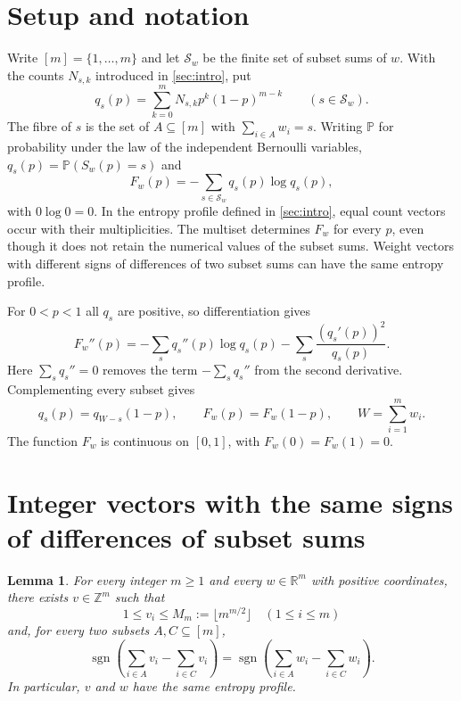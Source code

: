\documentclass[11pt,a4paper]{article}
\numberwithin{equation}{section}
\newtheorem{lemma}[theorem]{Lemma}
\theoremstyle{remark}
\newcommand{\Pp}{\mathbb P}
\newcommand{\R}{\mathbb R}
\newcommand{\Z}{\mathbb Z}
\newcommand{\sgn}{\operatorname{sgn}}
\begin{document}
\section{Setup and notation}\label{sec:setup}

Write $[m]=\{1,\ldots,m\}$ and let $\mathcal S_w$ be the finite set of subset sums of $w$. With the counts $N_{s,k}$ introduced in \cref{sec:intro}, put
\begin{equation}\label{eq:counts}
 q_s(p)=\sum_{k=0}^m N_{s,k}p^k(1-p)^{m-k}\qquad(s\in\mathcal S_w).
\end{equation}
The fibre of $s$ is the set of $A\subseteq[m]$ with $\sum_{i\in A}w_i=s$. Writing $\Pp$ for probability under the law of the independent Bernoulli variables, $q_s(p)=\Pp(S_w(p)=s)$ and
\begin{equation}\label{eq:entropy}
 F_w(p)=-\sum_{s\in\mathcal S_w}q_s(p)\log q_s(p),
\end{equation}
with $0\log0=0$. In the entropy profile defined in \cref{sec:intro}, equal count vectors occur with their multiplicities. The multiset determines $F_w$ for every $p$, even though it does not retain the numerical values of the subset sums. Weight vectors with different signs of differences of two subset sums can have the same entropy profile.

For $0<p<1$ all $q_s$ are positive, so differentiation gives
\begin{equation}\label{eq:curvature}
 F_w''(p)=-\sum_s q_s''(p)\log q_s(p)
            -\sum_s\frac{(q_s'(p))^2}{q_s(p)}.
\end{equation}
Here $\sum_s q_s''=0$ removes the term $-\sum_s q_s''$ from the second derivative. Complementing every subset gives
\begin{equation}\label{eq:symmetry}
 q_s(p)=q_{W-s}(1-p),\qquad F_w(p)=F_w(1-p),
 \qquad W=\sum_{i=1}^m w_i.
\end{equation}
The function $F_w$ is continuous on $[0,1]$, with $F_w(0)=F_w(1)=0$.

\section{Integer vectors with the same signs of differences of subset sums}\label{sec:finite}

\begin{lemma}\label{lem:representative}
For every integer $m\ge1$ and every $w\in\R^m$ with positive coordinates, there exists $v\in\Z^m$ such that
\[
 1\le v_i\le M_m:=\lfloor m^{m/2}\rfloor\quad(1\le i\le m)
\]
and, for every two subsets $A,C\subseteq[m]$,
\[
 \sgn\!\left(\sum_{i\in A}v_i-\sum_{i\in C}v_i\right)
 =\sgn\!\left(\sum_{i\in A}w_i-\sum_{i\in C}w_i\right).
\]
In particular, $v$ and $w$ have the same entropy profile.
\end{lemma}
\end{document}
